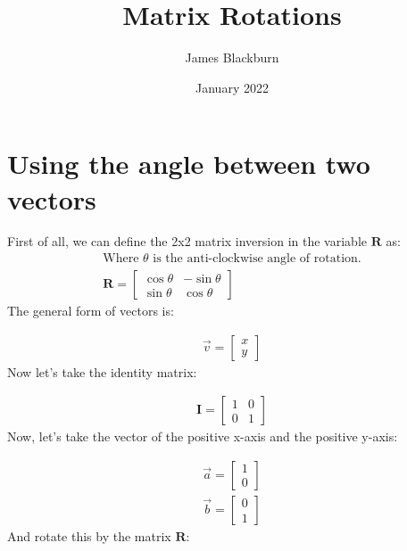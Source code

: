 \documentclass{article}
\title{Matrix Rotations}
\author{James Blackburn}
\date{January 2022}
\begin{document}
\maketitle
\section{Using the angle between two vectors}
First of all, we can define the 2x2 matrix inversion in the variable $\boldsymbol{R}$ as:
\begin{gather} 
\text{Where }\theta \text{ is the anti-clockwise angle of rotation.} \\
\boldsymbol{R}  = \begin{bmatrix}\cos \theta & -\sin \theta \\ \sin \theta & \cos \theta \end{bmatrix} 
\end{gather} 
The general form of vectors is:

\begin{gather} 
\vec{v} = \begin{bmatrix}x  \\ y \end{bmatrix} 
\end{gather} 
Now let's take the identity matrix:

\begin{gather} 
\boldsymbol{I} = \begin{bmatrix}1 & 0 \\ 0 & 1 \end{bmatrix} 
\end{gather} 
Now, let's take the vector of the positive x-axis and the positive y-axis:

\begin{gather} 
\vec{a} = \begin{bmatrix}1  \\ 0 \end{bmatrix} \\
\vec{b} = \begin{bmatrix}0  \\ 1 \end{bmatrix} 
\end{gather} 
And rotate this by the matrix $\boldsymbol{R}$:
\end{document}
